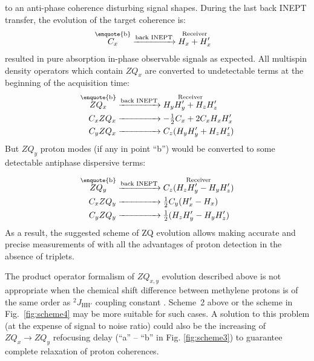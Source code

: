 \documentclass[twocolumn]{svjour3}           %
\begin{document}
to an anti-phase coherence 
disturbing signal shapes. During the last back INEPT transfer, the evolution of the target coherence is:
\begin{align}
\label{eq:term3:target}
   \overset{\text{\enquote{b}}}{C_x} & \xrightarrow{\text{back INEPT}} 
   \overset{\text{Receiver}}{H_x + H'_x}
\end{align}    
resulted in pure absorption in-phase observable signals as expected. All  
 multispin density operators which contain $ZQ_x$ are converted to undetectable terms at the beginning of the acquisition time:
\begin{subequations}
\label{eq:backZQx}
\begin{align}
   \label{eq:term3:zqx}
   \overset{\text{\enquote{b}}}{ZQ_x} & 
     \xrightarrow{\text{back INEPT}} 
     \overset{\text{Receiver}}{ H_y H'_y +  H_z H'_z} \\
   \label{eq:term3:cxzqx}
   {C_x ZQ_x} & \xrightarrow{\hphantom{\text{back INEPT}}} -\tfrac{1}{2}C_x + 2 C_x H_x H'_x \\
   \label{eq:term3:cyzqx}
   {C_y ZQ_x} & \xrightarrow{\hphantom{\text{back INEPT}}} C_z (H_y H'_y + H_z H'_z)
\end{align}
\end{subequations}
But $ZQ_y$ proton modes (if any in point \enquote{b}) would be converted to some detectable antiphase dispersive terms:

\begin{subequations}
\label{eq:backZQy}
\begin{align}
   \label{eq:term3:zqy}
     \overset{\text{\enquote{b}}}{ZQ_y} & \xrightarrow{\text{back INEPT}}
     \overset{\text{Receiver}}{C_z (H_z H'_y -  H_y H'_z )} \\
   \label{eq:term3:cxzqy}
   {C_x ZQ_y} & \xrightarrow{\hphantom{\text{back INEPT}}} \tfrac{1}{2}C_y ( H'_x- H_x ) \\
   \label{eq:term3:cyzqy}
   {C_y ZQ_y} & \xrightarrow{\hphantom{\text{back INEPT}}} \tfrac{1}{2}( H_z H'_y-  H_y H'_z )
\end{align}
\end{subequations}
As a result, the suggested scheme of 
ZQ evolution allows making accurate and precise measurements of 
\gtwoCH{} with all the advantages of proton detection in the absence 
of \clab{} triplets. 

The product operator formalism of $ZQ_{x,y}$ evolution described above is not appropriate when the 
chemical shift difference between methylene protons is of the same order as ${^2\!J_{\text{HH}'}}$ 
coupling constant \cite{cavanagh_protein_2007,benesi_primer_2015}. Scheme~2 above or the scheme in Fig.~\ref{fig:scheme4} may be more suitable for such cases.
A solution to this problem (at the expense of signal to noise ratio) could also be the increasing of $ZQ_x \rightarrow{} ZQ_y$
refocusing delay (\enquote{a} -- \enquote{b} in Fig. \ref{fig:scheme3}) to guarantee
complete relaxation of proton coherences.
\end{document}
